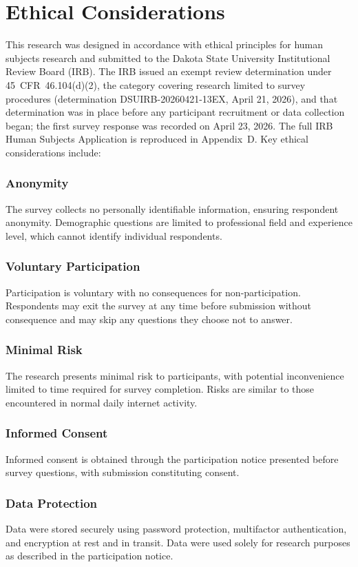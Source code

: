 \section{Ethical Considerations}

This research was designed in accordance with ethical principles for human subjects research and submitted to the Dakota State University Institutional Review Board (IRB). The IRB issued an exempt review determination under 45~CFR~46.104(d)(2), the category covering research limited to survey procedures (determination DSUIRB-20260421-13EX, April 21, 2026), and that determination was in place before any participant recruitment or data collection began; the first survey response was recorded on April 23, 2026. The full IRB Human Subjects Application is reproduced in Appendix~D. Key ethical considerations include:

\subsubsection{Anonymity} The survey collects no personally identifiable information, ensuring respondent anonymity. Demographic questions are limited to professional field and experience level, which cannot identify individual respondents.

\subsubsection{Voluntary Participation} Participation is voluntary with no consequences for non-participation. Respondents may exit the survey at any time before submission without consequence and may skip any questions they choose not to answer.

\subsubsection{Minimal Risk} The research presents minimal risk to participants, with potential inconvenience limited to time required for survey completion. Risks are similar to those encountered in normal daily internet activity.

\subsubsection{Informed Consent} Informed consent is obtained through the participation notice presented before survey questions, with submission constituting consent.

\subsubsection{Data Protection} Data were stored securely using password protection, multifactor authentication, and encryption at rest and in transit. Data were used solely for research purposes as described in the participation notice.


